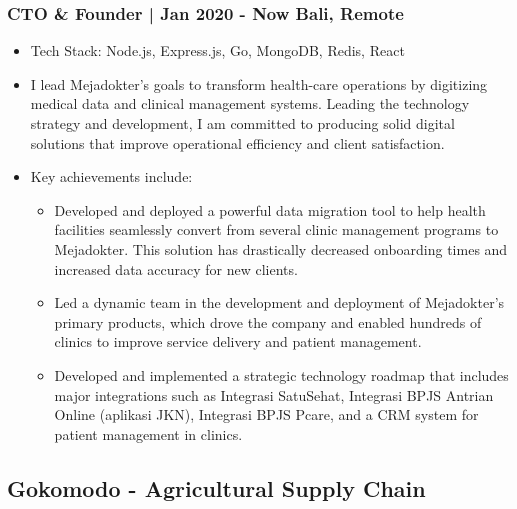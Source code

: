 \documentclass[11pt]{article}
\begin{document}
\subsubsection{CTO \& Founder | Jan 2020 - Now \hfill Bali, Remote}
\begin{itemize}
    \item Tech Stack: Node.js, Express.js, Go, MongoDB, Redis, React
    \item I lead Mejadokter's goals to transform health-care operations by digitizing medical data and clinical management systems. Leading the technology strategy and development, I am committed to producing solid digital solutions that improve operational efficiency and client satisfaction.
    \item Key achievements include:
          \begin{itemize}
              \item Developed and deployed a powerful data migration tool to help health facilities seamlessly convert from several clinic management programs to Mejadokter. This solution has drastically decreased onboarding times and increased data accuracy for new clients.
              \item Led a dynamic team in the development and deployment of Mejadokter's primary products, which drove the company and enabled hundreds of clinics to improve service delivery and patient management.
              \item  Developed and implemented a strategic technology roadmap that includes major integrations such as Integrasi SatuSehat, Integrasi BPJS Antrian Online (aplikasi JKN), Integrasi BPJS Pcare, and a CRM system for patient management in clinics.
          \end{itemize}
\end{itemize}

\subsection{Gokomodo - Agricultural Supply Chain}
\end{document}
